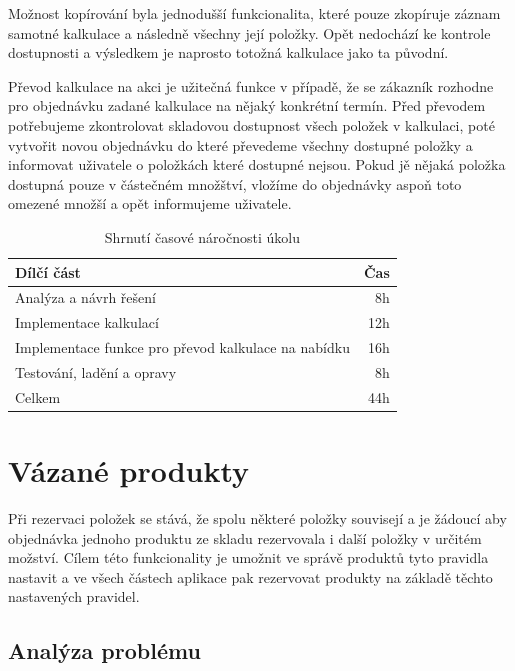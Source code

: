 Možnost kopírování byla jednodušší funkcionalita, které pouze zkopíruje záznam samotné kalkulace a následně všechny její položky. Opět nedochází ke kontrole dostupnosti a výsledkem je naprosto totožná kalkulace jako ta původní.

Převod kalkulace na akci je užitečná funkce v případě, že se zákazník rozhodne pro objednávku zadané kalkulace na nějaký konkrétní termín. Před převodem potřebujeme zkontrolovat skladovou dostupnost všech položek v kalkulaci, poté vytvořit novou objednávku do které převedeme všechny dostupné položky a informovat uživatele  o položkách které dostupné nejsou. Pokud jě nějaká položka dostupná pouze v částečném množštví, vložíme do objednávky aspoň toto omezené množší a opět informujeme uživatele.


\begin{table}
	\centering
	\caption[Časová náročnost úkolu na kalkulace]{Shrnutí časové náročnosti úkolu}
	\label{tab:TopLevelTableLabel}
	{
		\begin{tabular}{lr}
			\toprule
			Dílčí část & Čas\\
			\midrule
			Analýza a návrh řešení & 8h \\
			Implementace kalkulací & 12h \\
            Implementace funkce pro převod kalkulace na nabídku & 16h \\
            Testování, ladění a opravy & 8h \\
            \midrule
            Celkem  & 44h \\
			\midrule
		\end{tabular}
	}
\end{table}

\section{Vázané produkty}

Při rezervaci položek se stává, že spolu některé položky souvisejí a je žádoucí aby objednávka jednoho produktu ze skladu rezervovala i další položky v určitém možství. Cílem této funkcionality je umožnit ve správě produktů tyto pravidla nastavit a ve všech částech aplikace pak rezervovat produkty na základě těchto nastavených pravidel.

\subsection{Analýza problému}

